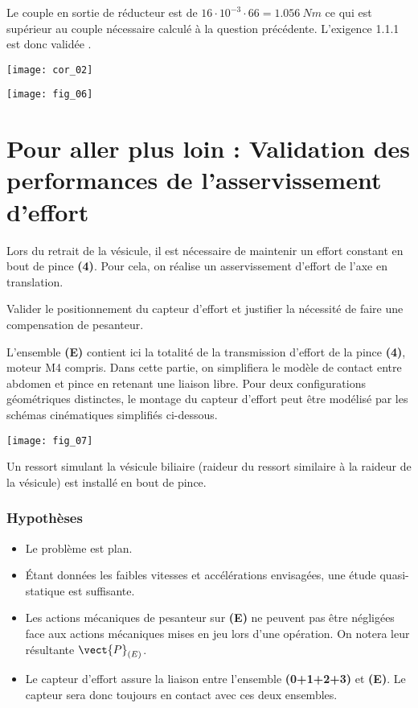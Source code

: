 \ifprof
\begin{corrige}
Le couple en sortie de réducteur est de $16\cdot 10^{-3} \cdot 66 = \SI{1,056}{Nm}$ ce qui est supérieur au couple nécessaire calculé à la question précédente. L'exigence 1.1.1 est donc validée .
\begin{center}
\texttt{[image: cor\_02]}
\end{center}

\end{corrige}
\else
\fi

\ifprof
\else

\begin{center}
\texttt{[image: fig\_06]}
\end{center}
\fi

\vspace{1cm}

\section*{Pour aller plus loin : Validation des performances de l'asservissement d'effort}
Lors du retrait de la vésicule, il est nécessaire de maintenir un effort constant en bout de pince \textbf{(4)}. Pour cela, on réalise un asservissement d'effort de l'axe en translation. 
\begin{obj}
Valider le positionnement du capteur d'effort et justifier la nécessité de faire une compensation de pesanteur. 
\end{obj}

\ifprof
\else
L'ensemble \textbf{(E)} contient ici la totalité de la transmission d’effort de la pince \textbf{(4)}, moteur M4 compris.
Dans cette partie, on simplifiera le modèle de contact entre abdomen et pince en retenant une liaison libre.
Pour deux configurations géométriques distinctes, le montage du capteur d’effort peut être modélisé par les
schémas cinématiques simplifiés ci-dessous.

\begin{center}
\texttt{[image: fig\_07]}
\end{center}

Un ressort simulant la vésicule biliaire (raideur du ressort similaire à la
raideur de la vésicule) est installé en bout de pince.
\subsubsection*{Hypothèses}
\begin{itemize}
\item Le problème est plan.
\item Étant données les faibles vitesses et accélérations envisagées, une étude quasi-statique est
suffisante.
\item Les actions mécaniques de pesanteur sur \textbf{(E)} ne peuvent pas être négligées face aux actions mécaniques mises en jeu lors d’une opération. On notera leur résultante $\vect{P}_{(E)}$.
\item Le capteur d’effort assure la liaison entre l’ensemble \textbf{(0+1+2+3)} et \textbf{(E)}. Le capteur sera donc toujours en contact avec ces deux ensembles.
\end{itemize}
